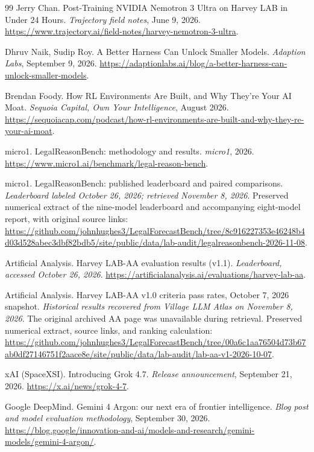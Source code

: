 \documentclass[11pt]{article}
\begin{document}
\begin{thebibliography}{99}
 Jerry Chan. Post-Training NVIDIA Nemotron 3 Ultra on Harvey LAB in Under 24 Hours. \emph{Trajectory field notes}, June 9, 2026. \url{https://www.trajectory.ai/field-notes/harvey-nemotron-3-ultra}.

 Dhruv Naik, Sudip Roy. A Better Harness Can Unlock Smaller Models. \emph{Adaption Labs}, September 9, 2026. \url{https://adaptionlabs.ai/blog/a-better-harness-can-unlock-smaller-models}.

 Brendan Foody. How RL Environments Are Built, and Why They're Your AI Moat. \emph{Sequoia Capital, Own Your Intelligence}, August 2026. \url{https://sequoiacap.com/podcast/how-rl-environments-are-built-and-why-they-re-your-ai-moat}.

 micro1. LegalReasonBench: methodology and results. \emph{micro1}, 2026. \url{https://www.micro1.ai/benchmark/legal-reason-bench}.

 micro1. LegalReasonBench: published leaderboard and paired comparisons. \emph{Leaderboard labeled October 26, 2026; retrieved November 8, 2026}. Preserved numerical extract of the nine-model leaderboard and accompanying eight-model report, with original source links: \url{https://github.com/johnhughes3/LegalForecastBench/tree/8c916227353e46248b4d03d528abec3dbf82bdb5/site/public/data/lab-audit/legalreasonbench-2026-11-08}.

 Artificial Analysis. Harvey LAB-AA evaluation results (v1.1). \emph{Leaderboard, accessed October 26, 2026}. \url{https://artificialanalysis.ai/evaluations/harvey-lab-aa}.

 Artificial Analysis. Harvey LAB-AA v1.0 criteria pass rates, October 7, 2026 snapshot. \emph{Historical results recovered from Village LLM Atlas on November 8, 2026}. The original archived AA page was unavailable during retrieval. Preserved numerical extract, source links, and ranking calculation: \url{https://github.com/johnhughes3/LegalForecastBench/tree/00a6c1aa76504d73b67ab0df27146751f2aace8e/site/public/data/lab-audit/lab-aa-v1-2026-10-07}.

 xAI (SpaceXSI). Introducing Grok 4.7. \emph{Release announcement}, September 21, 2026. \url{https://x.ai/news/grok-4-7}.

 Google DeepMind. Gemini 4 Argon: our next era of frontier intelligence. \emph{Blog post and model evaluation methodology}, September 30, 2026. \url{https://blog.google/innovation-and-ai/models-and-research/gemini-models/gemini-4-argon/}.


\end{thebibliography}
\end{document}
